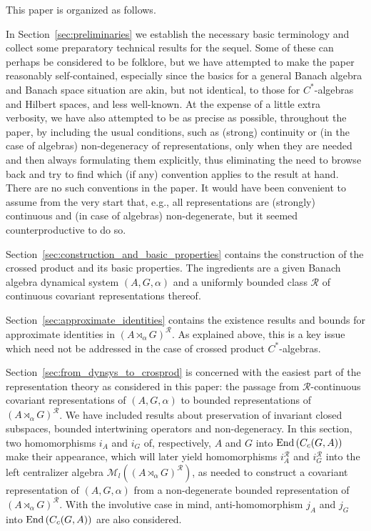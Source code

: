 \documentclass{amsart}
\theoremstyle{plain}
\theoremstyle{definition}
\numberwithin{equation}{section}
\begin{document}
\medskip

This paper is organized as follows.

In Section~\ref{sec:preliminaries} we establish the necessary basic terminology and collect some preparatory technical results for the sequel. Some of these can perhaps be considered to be folklore, but we have attempted to make the paper reasonably self-contained, especially since the basics for a general Banach algebra and Banach space situation are akin, but not identical, to those for $C^*$-algebras and Hilbert spaces, and less well-known. At the expense of a little extra verbosity, we have also attempted to be as precise as possible, throughout the paper, by including the usual conditions, such as (strong) continuity or (in the case of algebras) non-degeneracy of representations, only when they are needed and then always formulating them explicitly, thus eliminating the need to browse back and try to find which (if any) convention applies to the result at hand. There are no such conventions in the paper. It would have been convenient to assume from the very start that, e.g., all representations are (strongly) continuous and (in case of algebras) non-degenerate, but it seemed counterproductive to do so.

Section~\ref{sec:construction_and_basic_properties} contains the construction of the crossed product and its basic properties. The ingredients are a given Banach algebra dynamical system ${(A,G,\alpha)}$ and a uniformly bounded class ${\mathcal R}$ of continuous covariant representations thereof.

Section~\ref{sec:approximate_identities} contains the existence results and bounds for approximate identities in ${(A {\rtimes}_\alpha G)^\mathcal{R}}$. As explained above, this is a key issue which need not be addressed in the case of crossed product $C^*$-algebras.

Section~\ref{sec:from_dynsys_to_crosprod} is concerned with the easiest part of the representation theory as considered in this paper: the passage from ${\mathcal R}$-continuous covariant representations of ${(A,G,\alpha)}$ to bounded representations of ${(A {\rtimes}_\alpha G)^\mathcal{R}}$. We have included results about preservation of invariant closed subspaces, bounded intertwining operators and non-degeneracy. In this section, two homomorphisms $i_A$ and $i_G$ of, respectively, $A$ and $G$ into ${\textup{End\,}} (C_c(G,A))$ make their appearance, which will later yield homomorphisms $i_A^{\mathcal R}$ and $i_G^{\mathcal R}$ into the left centralizer algebra $\mathcal M_l({(A {\rtimes}_\alpha G)^\mathcal{R}})$, as needed to construct a covariant representation of ${(A,G,\alpha)}$ from a non-degenerate bounded representation of ${(A {\rtimes}_\alpha G)^\mathcal{R}}$. With the involutive case in mind, anti-homomorphism $j_A$ and $j_G$ into ${\textup{End\,}} (C_c(G,A))$ are also considered.
\end{document}
